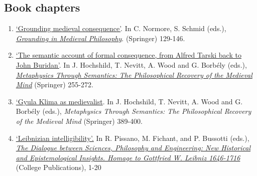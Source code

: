 \subsection{Book chapters}
\begin{enumerate}
	\setcounter{enumi}{\value{publicationCounter}}	%
	\item {}
{}
{
	\href{https://link.springer.com/chapter/10.1007/978-3-031-53666-3_6}{`Grounding medieval consequence'}. In C. Normore, S. Schmid (eds.), \href{https://link.springer.com/book/10.1007/978-3-031-53666-3}{\emph{Grounding in Medieval Philosophy}}. (Springer) 129-146.}
{}
\item {}
{}
{
	\href{https://www.academia.edu/29440650/The_semantic_account_of_formal_consequence_from_Alfred_Tarski_back_to_John_Buridan}{`The semantic account of formal consequence, from Alfred Tarski back to John Buridan'}. In J. Hochshild, T. Nevitt, A. Wood and G. Borb\'{e}ly (eds.), \href{https://link.springer.com/chapter/10.1007/978-3-031-15026-5_15}{\emph{Metaphysics Through Semantics: The Philosophical Recovery of the Medieval Mind}} (Springer) 255-272.}
{}
\item \datedsubsectionnarrow{}
{}
{
	\href{https://link.springer.com/content/pdf/bbm:978-3-031-15026-5/1}{`Gyula Klima as medievalist}. In J. Hochshild, T. Nevitt, A. Wood and G. Borb\'{e}ly (eds.), \emph{Metaphysics Through Semantics: The Philosophical Recovery of the Medieval Mind} (Springer) 389-400.}
{}
\item {}
{}
{
	\href{https://www.academia.edu/14265939/Leibnizian_intelligibility}{`Leibnizian intelligibility'.} In R. Pissano, M. Fichant, and P. Bussotti (eds.), \href{http://collegepublications.co.uk/dialogues/?00005}{\emph{The Dialogue between Sciences, Philosophy and Engineering: New Historical and Epistemological Insights. Homage to Gottfried W. Leibniz 1646-1716}} (College Publications), 1-20}
{}
	\setcounter{publicationCounter}{\value{enumi}}	%
\end{enumerate}
